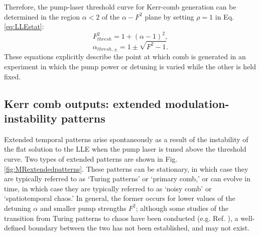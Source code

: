 Therefore, the pump-laser threshold curve for Kerr-comb generation can be determined in the region $\alpha<2$ of the $\alpha-F^2$ plane by setting $\rho=1$ in Eq. \ref{eq:LLEstat}: 
\begin{equation}
F^2_{thresh}=1+(\alpha-1)^2, \label{eq:F2thresh}
\end{equation}
\begin{equation}
\alpha_{thresh,\pm}=1\pm\sqrt{F^2-1}. \label{eq:alphathresh}
\end{equation}
These equations explicitly describe the point at which comb is generated in an experiment in which the pump power or detuning is varied while the other is held fixed. 



\subsection{Kerr comb outputs: extended modulation-instability patterns}

Extended temporal patterns arise spontaneously as a result of the instability of the flat solution to the LLE when the pump laser is tuned above the threshold curve. Two types of extended patterns are shown in Fig. \ref{fig:MRextendedpatterns}. These patterns can be stationary, in which case they are typically referred to as `Turing patterns' or `primary comb,' or can evolve in time, in which case they are typically referred to as `noisy comb' or `spatiotemporal chaos.' In general, the former occurs for lower values of the detuning $\alpha$ and smaller pump strengths $F^2$; although some studies of the transition from Turing patterns to chaos have been conducted (e.g. Ref. \cite{Coillet2014}), a well-defined boundary between the two has not been established, and may not exist. 

